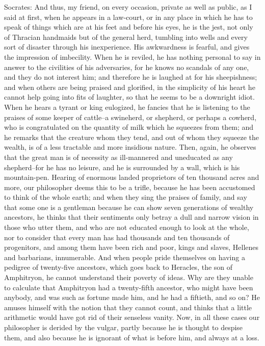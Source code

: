 Socrates: And thus, my friend, on every occasion, private as well as
public, as I said at first, when he appears in a law-court, or in any
place in which he has to speak of things which are at his feet and
before his eyes, he is the jest, not only of Thracian handmaids but of
the general herd, tumbling into wells and every sort of disaster through
his inexperience. His awkwardness is fearful, and gives the impression
of imbecility. When he is reviled, he has nothing personal to say in
answer to the civilities of his adversaries, for he knows no scandals
of any one, and they do not interest him; and therefore he is laughed at
for his sheepishness; and when others are being praised and glorified,
in the simplicity of his heart he cannot help going into fits of
laughter, so that he seems to be a downright idiot. When he hears a
tyrant or king eulogized, he fancies that he is listening to the
praises of some keeper of cattle--a swineherd, or shepherd, or perhaps a
cowherd, who is congratulated on the quantity of milk which he squeezes
from them; and he remarks that the creature whom they tend, and out of
whom they squeeze the wealth, is of a less tractable and more insidious
nature. Then, again, he observes that the great man is of necessity as
ill-mannered and uneducated as any shepherd--for he has no leisure,
and he is surrounded by a wall, which is his mountain-pen. Hearing
of enormous landed proprietors of ten thousand acres and more, our
philosopher deems this to be a trifle, because he has been accustomed to
think of the whole earth; and when they sing the praises of family, and
say that some one is a gentleman because he can show seven generations
of wealthy ancestors, he thinks that their sentiments only betray a
dull and narrow vision in those who utter them, and who are not educated
enough to look at the whole, nor to consider that every man has had
thousands and ten thousands of progenitors, and among them have been
rich and poor, kings and slaves, Hellenes and barbarians, innumerable.
And when people pride themselves on having a pedigree of twenty-five
ancestors, which goes back to Heracles, the son of Amphitryon, he cannot
understand their poverty of ideas. Why are they unable to calculate that
Amphitryon had a twenty-fifth ancestor, who might have been anybody,
and was such as fortune made him, and he had a fiftieth, and so on? He
amuses himself with the notion that they cannot count, and thinks that a
little arithmetic would have got rid of their senseless vanity. Now, in
all these cases our philosopher is derided by the vulgar, partly because
he is thought to despise them, and also because he is ignorant of what
is before him, and always at a loss.

